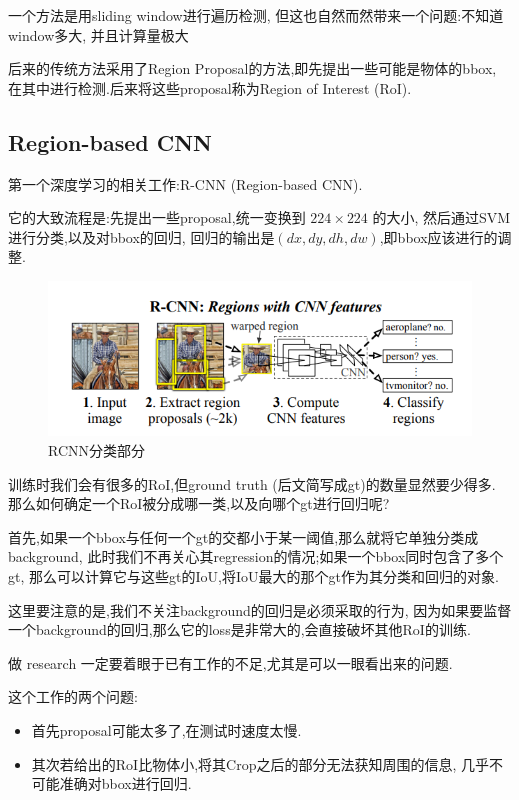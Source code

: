 一个方法是用sliding window进行遍历检测,
但这也自然而然带来一个问题:不知道window多大, 并且计算量极大

后来的传统方法采用了Region Proposal的方法,即先提出一些可能是物体的bbox,
在其中进行检测.后来将这些proposal称为Region of Interest (RoI).

\subsection{Region-based CNN}

第一个深度学习的相关工作\cite{RCNN}:R-CNN (Region-based CNN).

它的大致流程是:先提出一些proposal,统一变换到 $224\times 224$ 的大小,
然后通过SVM进行分类,以及对bbox的回归,
回归的输出是$(dx, dy, dh, dw)$,即bbox应该进行的调整.

\begin{figure}[htbp]
    \centering
    \includegraphics[scale=0.9]{figures/RCNN_classification.png}
    \caption{RCNN分类部分}
\end{figure}

训练时我们会有很多的RoI,但ground truth (后文简写成gt)的数量显然要少得多.
那么如何确定一个RoI被分成哪一类,以及向哪个gt进行回归呢?

首先,如果一个bbox与任何一个gt的交都小于某一阈值,那么就将它单独分类成background,
此时我们不再关心其regression的情况;如果一个bbox同时包含了多个gt,
那么可以计算它与这些gt的IoU,将IoU最大的那个gt作为其分类和回归的对象.

这里要注意的是,我们不关注background的回归是必须采取的行为,
因为如果要监督一个background的回归,那么它的loss是非常大的,会直接破坏其他RoI的训练.

做 research 一定要着眼于已有工作的不足,尤其是可以一眼看出来的问题.

这个工作的两个问题:
\begin{itemize}
    \item 首先proposal可能太多了,在测试时速度太慢.
    \item 其次若给出的RoI比物体小,将其Crop之后的部分无法获知周围的信息,
    几乎不可能准确对bbox进行回归.
\end{itemize}

